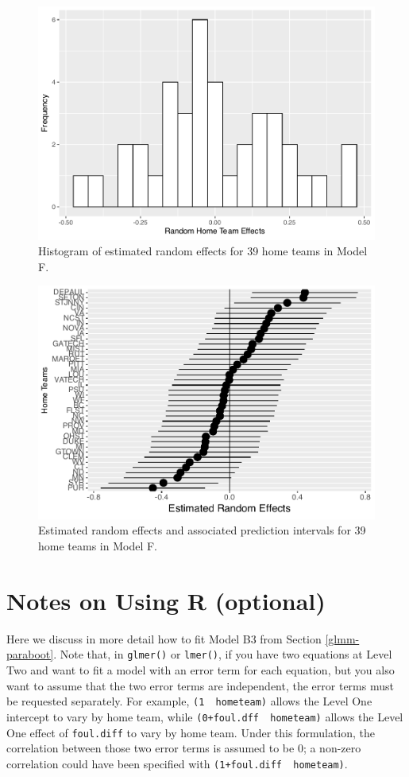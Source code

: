 \documentclass[
]{krantz}
\begin{document}
\begin{figure}

{\centering \includegraphics[width=0.6\linewidth]{bookdown-BeyondMLR_files/figure-latex/gmu-hist1-1} 

}

\caption{Histogram of estimated random effects for 39 home teams in Model F.}\label{fig:gmu-hist1}
\end{figure}

\begin{figure}

{\centering \includegraphics[width=0.6\linewidth]{bookdown-BeyondMLR_files/figure-latex/gmu-cis1-1} 

}

\caption{Estimated random effects and associated prediction intervals for 39 home teams in Model F.}\label{fig:gmu-cis1}
\end{figure}

\hypertarget{usingR-glmm}{%
\section{Notes on Using R (optional)}\label{usingR-glmm}}

Here we discuss in more detail how to fit Model B3 from Section \ref{glmm-paraboot}. Note that, in \texttt{glmer()} or \texttt{lmer()}, if you have two equations at Level Two and want to fit a model with an error term for each equation, but you also want to assume that the two error terms are independent, the error terms must be requested separately. For example, \texttt{(1\ \textbar{}\ hometeam)} allows the Level One intercept to vary by home team, while \texttt{(0+foul.dff\ \textbar{}\ hometeam)} allows the Level One effect of \texttt{foul.diff} to vary by home team. Under this formulation, the correlation between those two error terms is assumed to be 0; a non-zero correlation could have been specified with \texttt{(1+foul.diff\ \textbar{}\ hometeam)}.
\end{document}
